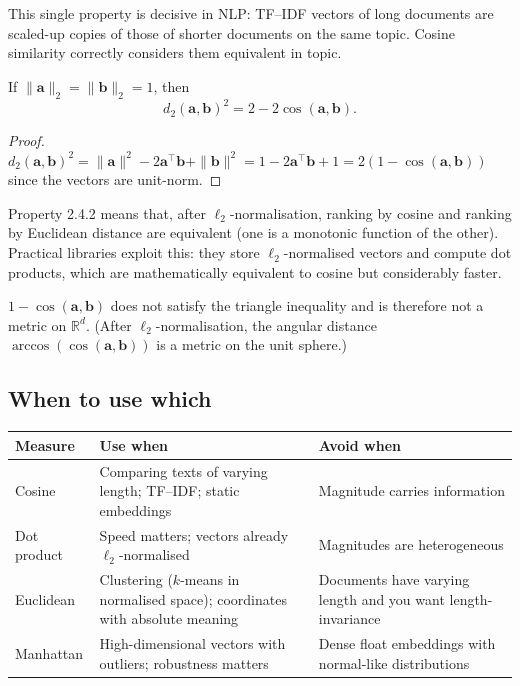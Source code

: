 This single property is decisive in NLP: TF--IDF vectors of long documents are scaled-up copies of those of shorter documents on the same topic. Cosine similarity correctly considers them equivalent in topic.

\begin{property}
If $\|\mathbf{a}\|_2 = \|\mathbf{b}\|_2 = 1$, then
\[ d_2(\mathbf{a}, \mathbf{b})^2 = 2 - 2 \cos(\mathbf{a}, \mathbf{b}). \]
\end{property}

\begin{proof}
$d_2(\mathbf{a}, \mathbf{b})^2 = \|\mathbf{a}\|^2 - 2 \mathbf{a}^\top \mathbf{b} + \|\mathbf{b}\|^2 = 1 - 2 \mathbf{a}^\top \mathbf{b} + 1 = 2(1 - \cos(\mathbf{a}, \mathbf{b}))$ since the vectors are unit-norm.
\end{proof}

\begin{remark}
Property 2.4.2 means that, after $\ell_2$-normalisation, ranking by cosine and ranking by Euclidean distance are equivalent (one is a monotonic function of the other). Practical libraries exploit this: they store $\ell_2$-normalised vectors and compute dot products, which are mathematically equivalent to cosine but considerably faster.
\end{remark}

\begin{property}
$1 - \cos(\mathbf{a}, \mathbf{b})$ does not satisfy the triangle inequality and is therefore not a metric on $\mathbb{R}^d$. (After $\ell_2$-normalisation, the angular distance $\arccos(\cos(\mathbf{a}, \mathbf{b}))$ is a metric on the unit sphere.)
\end{property}

\subsection{When to use which}

\begin{center}
\begin{tabular}{|l|l|l|}
\hline
\textbf{Measure} & \textbf{Use when} & \textbf{Avoid when} \\
\hline
Cosine & Comparing texts of varying length; TF--IDF; static embeddings & Magnitude carries information \\
Dot product & Speed matters; vectors already $\ell_2$-normalised & Magnitudes are heterogeneous \\
Euclidean & Clustering ($k$-means in normalised space); coordinates with absolute meaning & Documents have varying length and you want length-invariance \\
Manhattan & High-dimensional vectors with outliers; robustness matters & Dense float embeddings with normal-like distributions \\
\hline
\end{tabular}
\end{center}

